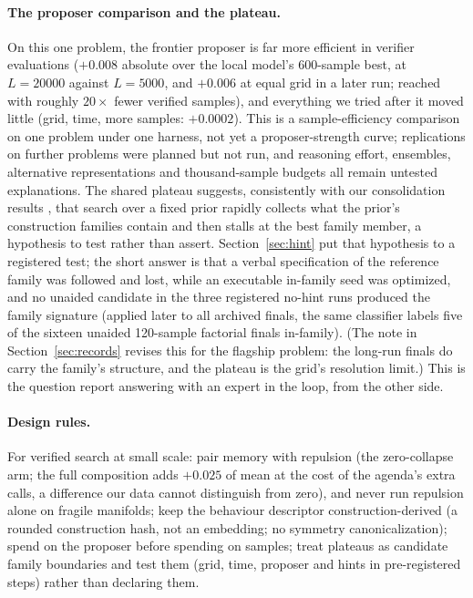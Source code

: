 \documentclass[11pt]{article}
\begin{document}
\paragraph{The proposer comparison and the plateau.} On this one problem,
the frontier proposer is far more efficient in verifier evaluations
($+0.008$ absolute over the local model's 600-sample best, at
$L{=}20000$ against $L{=}5000$, and $+0.006$ at equal grid in a later
run; reached with roughly $20\times$ fewer verified samples), and
everything we tried after it moved little (grid, time, more samples:
$+0.0002$). This is a sample-efficiency comparison on one problem under
one harness, not yet a proposer-strength curve; replications on further
problems were planned but not run, and reasoning effort, ensembles, alternative
representations and thousand-sample budgets all remain untested
explanations. The shared plateau suggests, consistently with our
consolidation results \citep{ono2026mass}, that search over a fixed prior
rapidly collects what the prior's construction families contain and then
stalls at the best family member, a hypothesis to test rather than
assert. Section~\ref{sec:hint} put that hypothesis to a registered test; the
short answer is that a verbal specification of the reference family was
followed and lost, while an executable in-family seed was optimized, and
no unaided candidate in the three registered no-hint runs produced the
family signature (applied later to all archived finals, the same
classifier labels five of the sixteen unaided 120-sample factorial
finals in-family). (The note in
Section~\ref{sec:records} revises this for the flagship problem: the long-run
finals do carry the family's structure, and the plateau is the grid's
resolution limit.) This is the question
\citet{georgiev2025exploration} report answering with an expert in the
loop, from the other side.

\paragraph{Design rules.} For verified search at small scale: pair
memory with repulsion (the zero-collapse arm; the full composition adds
$+0.025$ of mean at the cost of the agenda's extra calls, a difference
our data cannot distinguish from zero), and never run repulsion alone on
fragile manifolds; keep the
behaviour descriptor construction-derived (a rounded construction hash,
not an embedding; no symmetry canonicalization); spend on
the proposer before spending on samples; treat plateaus as candidate family
boundaries and test them (grid, time, proposer and hints in
pre-registered steps) rather than declaring them.
\end{document}
